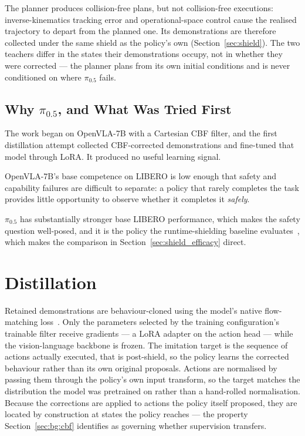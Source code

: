 \documentclass[a4paper,11pt]{report}
\begin{document}
The planner produces collision-free plans, but not collision-free executions: inverse-kinematics
tracking error and operational-space control cause the realised trajectory to depart from the
planned one. Its demonstrations are therefore collected under the same shield as the policy's
own (Section~\ref{sec:shield}). The two teachers differ in the states their demonstrations
occupy, not in whether they were corrected --- the planner plans from its own initial
conditions and is never conditioned on where $\pi_{0.5}$ fails.


\subsection{Why \texorpdfstring{$\pi_{0.5}$}{pi 0.5}, and What Was Tried First}
\label{sec:base_choice}

The work began on OpenVLA-7B with a Cartesian CBF filter, and the first
distillation attempt collected CBF-corrected demonstrations and fine-tuned that model through LoRA.
It produced no useful learning signal.

OpenVLA-7B's base competence on LIBERO is low enough that safety and capability failures are difficult to separate: a policy that rarely completes the task provides
little opportunity to observe whether it completes it \emph{safely}.

$\pi_{0.5}$ has substantially stronger base LIBERO
performance, which makes the safety question well-posed, and it is the policy the runtime-shielding
baseline evaluates~\cite{vlsa2026}, which makes the comparison in
Section~\ref{sec:shield_efficacy} direct.

\section{Distillation}\label{sec:distillation}

Retained demonstrations are behaviour-cloned using the model's native flow-matching
loss~\cite{physicalintelligence2025pi05,black2024pi0}. Only the parameters selected by the training
configuration's trainable filter receive gradients --- a LoRA adapter on the action head --- while
the vision-language backbone is frozen. The imitation target is the sequence of actions actually executed,
that is post-shield, so the policy learns the corrected behaviour rather than its own original
proposals. Actions are normalised by passing them through the policy's own input transform, so the
target matches the distribution the model was pretrained on rather than a hand-rolled
normalisation. Because the corrections are applied to actions the policy itself proposed, they are located by
construction at states the policy reaches --- the property Section~\ref{sec:bg:cbf} identifies as
governing whether supervision transfers.
\end{document}
